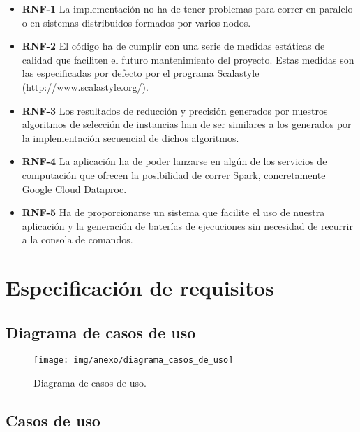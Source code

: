 \begin{itemize}

\item \textbf{RNF-1} La implementación no ha de tener problemas para correr en paralelo o en sistemas distribuidos formados por varios nodos.

\item \textbf{RNF-2} El código ha de cumplir con una serie de medidas estáticas de calidad que faciliten el futuro mantenimiento del proyecto. Estas medidas son las especificadas por defecto por el programa Scalastyle (\url{http://www.scalastyle.org/}).

\item \textbf{RNF-3} Los resultados de reducción y precisión generados por nuestros algoritmos de selección de instancias han de ser similares a los generados por la implementación secuencial de dichos algoritmos.

\item \textbf{RNF-4} La aplicación ha de poder lanzarse en algún de los servicios de computación que ofrecen la posibilidad de correr Spark, concretamente Google Cloud Dataproc.

\item \textbf{RNF-5} Ha de proporcionarse un sistema que facilite el uso de nuestra aplicación y la generación de baterías de ejecuciones sin necesidad de recurrir a la consola de comandos.

\end{itemize}

\section{Especificación de requisitos}

\subsection{Diagrama de casos de uso}

	\begin{figure}[!h]
		\centering
		\texttt{[image: img/anexo/diagrama\_casos\_de\_uso]}
		\caption{Diagrama de casos de uso.}\label{fig:img/anexo/diagrama_casos_de_uso}
	\end{figure}


 
\subsection{Casos de uso}
 

